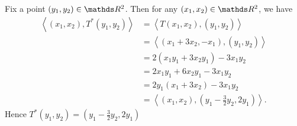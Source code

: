 \documentclass{review-sheet}
\begin{document}
\begin{solution}
  Fix a point $(y_1,y_2)\in \R^2$. Then for any $(x_1,x_2)\in \R^2$, we have
  \begin{align*}
    \left<(x_1,x_2),T^*(y_1,y_2) \right> &= \left<T(x_1,x_2),(y_1,y_2) \right>  \\
                                         &= \left<(x_1+3x_2,-x_1),(y_1,y_2) \right>  \\
                                         &= 2(x_1y_1+3x_2y_1)-3x_1y_2 \\
                                         &= 2x_1y_1+6x_2y_1-3x_1y_2 \\
                                         &= 2y_1(x_1+3x_2)-3x_1y_2 \\
                                         &=
                                         \left<(x_1,x_2),\left(y_1-\frac{3}{2}y_2,2y_1\right)
                                         \right>
  .\end{align*}
  Hence $T^*(y_1,y_2)=(y_1-\frac{3}{2}y_2,2y_1)$
\end{solution}
\end{document}
